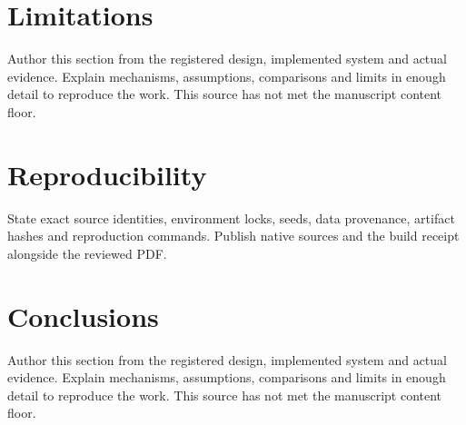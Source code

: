 \documentclass[11pt]{article}
\begin{document}
\section{Limitations}\label{sec:limitations}
Author this section from the registered design, implemented system and actual evidence. Explain mechanisms, assumptions, comparisons and limits in enough detail to reproduce the work. This source has not met the manuscript content floor.

\section{Reproducibility}\label{sec:reproducibility}
State exact source identities, environment locks, seeds, data provenance, artifact hashes and reproduction commands. Publish native sources and the build receipt alongside the reviewed PDF.

\section{Conclusions}\label{sec:conclusions}
Author this section from the registered design, implemented system and actual evidence. Explain mechanisms, assumptions, comparisons and limits in enough detail to reproduce the work. This source has not met the manuscript content floor.

% 
% 
\end{document}
